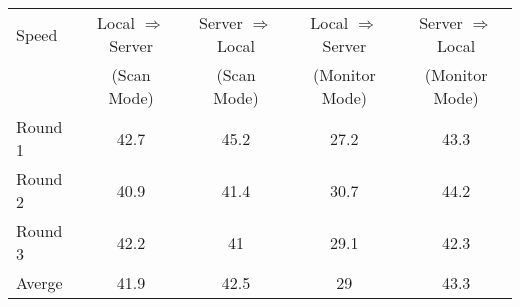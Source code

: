 \begin{center}
  \begin{tabular}{ | l || c | c | c | c | }
    \hline
Speed	&	Local $\Rightarrow$ Server &	Server $\Rightarrow$ Local &	Local $\Rightarrow$ Server & Server $\Rightarrow$ Local\\
     	& (Scan Mode) &	(Scan Mode) &	(Monitor Mode)	& (Monitor Mode)\\
\hline\hline
Round 1	& 42.7 & 45.2 & 27.2 & 43.3 \\ \hline
Round 2	& 40.9 & 41.4 & 30.7 & 44.2 \\ \hline
Round 3	& 42.2 & 41	& 29.1 & 42.3	\\ \hline
Averge 	& 41.9 & 42.5 &	29 & 43.3 \\ 
	\hline
  \end{tabular}
\end{center}
 
